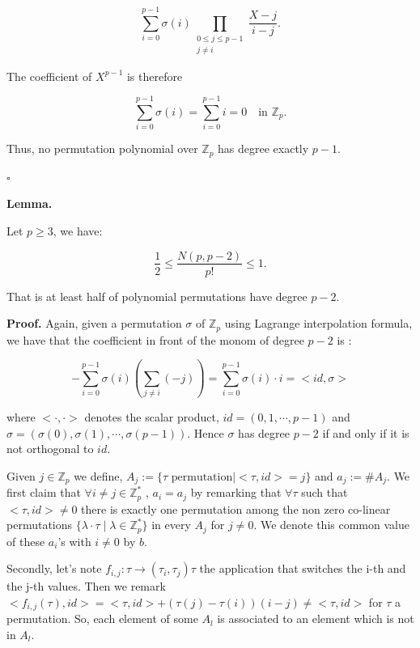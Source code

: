 \documentclass{article}
\begin{document}
\[
\sum_{i=0}^{p-1} \sigma(i) 
\prod_{\substack{0 \leq j \leq p-1 \\ j \neq i}} 
\frac{X - j}{i - j}.
\]

The coefficient of $X^{p-1}$ is therefore

\[
\sum_{i=0}^{p-1} \sigma(i) 
= \sum_{i=0}^{p-1} i 
= 0 \quad \text{in } \mathbb{Z}_p.
\]

Thus, no permutation polynomial over $\mathbb{Z}_p$ 
has degree exactly $p-1$.

\hfill $\square$

\vspace{0.3cm}
\textbf{Lemma.}

Let $p \geq 3$, we have:

\[
\frac{1}{2} \leq\frac{N(p, p-2)}{p!} \leq 1.
\]

That is at least half of polynomial permutations have degree $p-2$.

\textbf{Proof.}
Again, given a permutation $\sigma$ of $\mathbb{Z}_p$ using Lagrange interpolation formula, we have that the coefficient in front of the monom of degree $p-2$ is :

\[
- \sum_{i=0}^{p-1} \sigma(i) (\sum_{j \neq i} (-j)) = \sum_{i=0}^{p-1} \sigma(i)\cdot i = <id, \sigma>
\] 

where $<\cdot,\cdot>$ denotes the scalar product, $id = (0,1,\cdots,p-1)$ and $\sigma = (\sigma(0),\sigma(1),\cdots, \sigma(p-1))$. Hence $\sigma$ has degree $p-2$ if and only if it is not orthogonal to $id$.
\vspace{0.3cm}

Given $j \in \mathbb{Z}_p$ we define, $A_j :=\{\tau \text{ permutation} \mid <\tau, id> = j \}$ and $a_j:=\#A_j$. We first claim that $\forall i \neq j \in \mathbb{Z}_p^*$ , $a_i=a_j$ by remarking that $\forall \tau$ such that $<\tau,id> \neq 0$ there is exactly one permutation among the non zero co-linear permutations $\{ \lambda \cdot\tau \mid \lambda \in \mathbb{Z}_p^*\}$ in every $A_j$ for $j\neq0$.  
We denote this common value of these $a_i$'s with $i\neq 0$ by $b$.

\vspace{0.3cm}

Secondly, let's note $f_{i,j}: \tau \to (\tau_i,\tau_j) \tau$ the application that switches the i-th and the j-th values. Then we remark $<f_{i,j}(\tau), id> = <\tau,id> + (\tau(j) - \tau(i))(i-j) \neq <\tau,id>$ for $\tau$ a permutation. So, each element of some $A_l$ is associated to an element which is not in $A_l$. 
\vspace{0.3cm}
\end{document}
